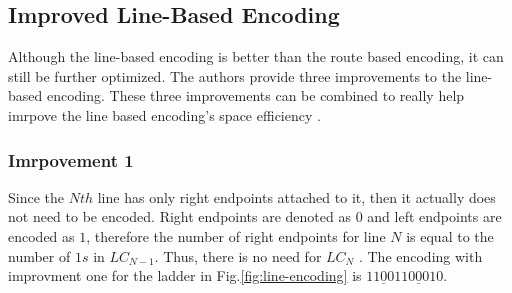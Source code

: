 \subsection{Improved Line-Based Encoding}
Although the line-based encoding is better than the route based 
encoding, it can still be further optimized. The authors provide 
three improvements to the line-based encoding. These three improvements
can be combined to really help imrpove the line based encoding's 
space efficiency \cite{A5}. 
\subsubsection{Imrpovement 1}
Since the $Nth$ line has only right endpoints attached to it, 
then it actually does not need to be encoded. Right endpoints 
are denoted as $0$ and left endpoints are encoded as $1$, therefore the number of right endpoints 
for line $N$ is equal to the number of $1s$ in $LC_{N-1}$.
Thus, there is no need for $LC_{N}$ \cite{A5}. The encoding with improvment 
one for the ladder in Fig.\ref{fig:line-encoding} is $11\underline{0}0110\underline{0}010$.
